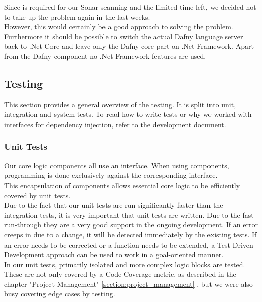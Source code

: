 Since  is required for our Sonar scanning and the limited time left,
we decided not to take up the problem again in the last weeks. \\

However, this would certainly be a good approach to solving the problem.
Furthermore it should be possible to switch the actual Dafny language server back to .Net Core
and leave only the Dafny core part on .Net Framework.
Apart from the Dafny component no .Net Framework features are used.

\subsection{Testing}

This section provides a general overview of the testing.
It is split into unit, integration and system tests.
To read how to write tests or why we worked with interfaces for dependency injection, refer to the development document.

\subsubsection{Unit Tests}
Our core logic components all use an interface.
When using components, programming is done exclusively against the corresponding interface. \\

This encapsulation of components allows essential core logic to be efficiently covered by unit tests. \\

Due to the fact that our unit tests are run significantly faster than the integration tests, it is very important that unit tests are written.
Due to the fast run-through they are a very good support in the ongoing development.
If an error creeps in due to a change, it will be detected immediately by the existing tests.
If an error needs to be corrected or a function needs to be extended, a Test-Driven-Development approach can be used to work in a goal-oriented manner. \\

In our unit tests, primarily isolated and more complex logic blocks are tested.
These are not only covered by a Code Coverage metric, as described in the chapter "Project Management"
\ref{section:project_management} ,
but we were also busy covering edge cases by testing.

